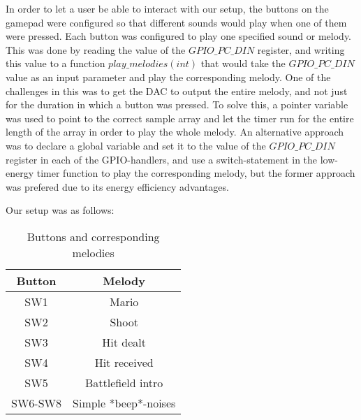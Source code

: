 In order to let a user be able to interact with our setup, the buttons on the gamepad were configured so that different sounds would play when one of them were pressed. Each button was configured to play one specified sound or melody. This was done by reading the value of the $GPIO\_PC\_DIN$ register, and writing this value to a function $play\_melodies(int)$ that would take the $GPIO\_PC\_DIN$ value as an input parameter and play the corresponding melody. One of the challenges in this was to get the DAC to output the entire melody, and not just for the duration in which a button was pressed. To solve this, a pointer variable was used to point to the correct sample array and let the timer run for the entire length of the array in order to play the whole melody. An alternative approach was to declare a global variable and set it to the value of the $GPIO\_PC\_DIN$ register in each of the GPIO-handlers, and use a switch-statement in the low-energy timer function to play the corresponding melody, but the former approach was prefered due to its energy efficiency advantages.

Our setup was as follows:

\begin{table}[ht]
\caption{Buttons and corresponding melodies}
\centering
\begin{tabular}{c c}
\hline
\hline %
Button & Melody \\ [0.5ex]
\hline
SW1 & Mario \\
SW2 & Shoot \\
SW3 & Hit dealt \\
SW4 & Hit received \\
SW5 & Battlefield intro \\
SW6-SW8 & Simple *beep*-noises \\
\hline
\end{tabular}
\label{table:nonlin}
\end{table}